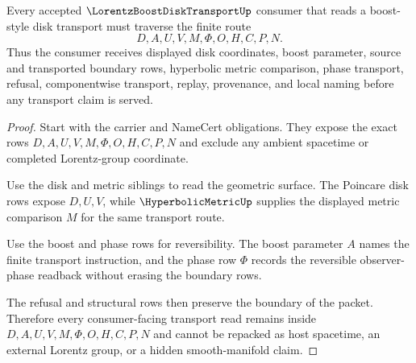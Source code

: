 \begin{theorem}
\label{thm:lorentz-boost-disk-transport-reversible-route}
Every accepted $\LorentzBoostDiskTransportUp$ consumer that reads a boost-style disk transport must traverse the finite route
$$
D,A,U,V,M,\Phi,O,H,C,P,N.
$$
Thus the consumer receives displayed disk coordinates, boost parameter, source and transported boundary rows, hyperbolic metric comparison, phase transport, refusal, componentwise transport, replay, provenance, and local naming before any transport claim is served.
\end{theorem}
\begin{proof}
Start with the carrier and NameCert obligations. They expose the exact rows $D,A,U,V,M,\Phi,O,H,C,P,N$ and exclude any ambient spacetime or completed Lorentz-group coordinate.

Use the disk and metric siblings to read the geometric surface. The Poincare disk rows expose $D,U,V$, while $\HyperbolicMetricUp$ supplies the displayed metric comparison $M$ for the same transport route.

Use the boost and phase rows for reversibility. The boost parameter $A$ names the finite transport instruction, and the phase row $\Phi$ records the reversible observer-phase readback without erasing the boundary rows.

The refusal and structural rows then preserve the boundary of the packet. Therefore every consumer-facing transport read remains inside $D,A,U,V,M,\Phi,O,H,C,P,N$ and cannot be repacked as host spacetime, an external Lorentz group, or a hidden smooth-manifold claim.
\end{proof}



